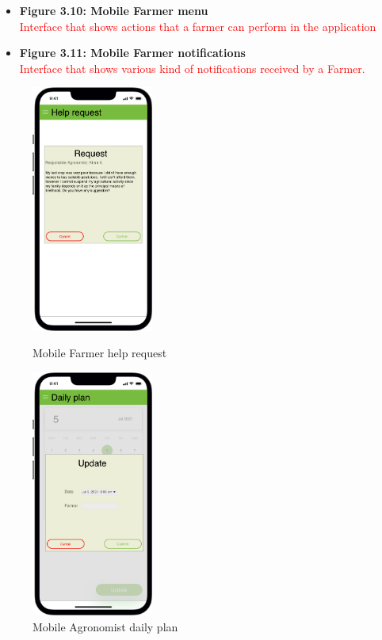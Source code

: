 \begin{itemize}
    \item \textbf{Figure 3.10: Mobile Farmer menu}\\ 
    \textcolor{red}{Interface that shows actions that a farmer can perform in the application}
\end{itemize}
\begin{itemize}
    \item \textbf{Figure 3.11: Mobile Farmer notifications}\\ 
    \textcolor{red}{Interface that shows various kind of notifications received by a Farmer.}
\end{itemize}
\newpage

\begin{figure}[H]
  \centering
   \begin{minipage}{0.4\textwidth}
     \includegraphics[width=40mm,scale=0.9]{./Images//Mocks/Mobile/Farmer_help_req.png}
     \caption{Mobile Farmer help request}
   \end{minipage}
    \hfill
   \begin{minipage}{0.4\textwidth}
     \includegraphics[width=40mm,scale=0.9]{./Images//Mocks/Mobile/Agronomist_daily_plan.png}
     \caption{Mobile Agronomist daily plan}
   \end{minipage}
\end{figure}

